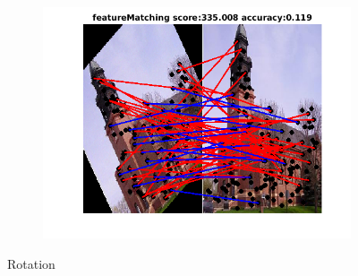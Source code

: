 \documentclass[
	fontsize=12pt,
	paper=a4,
	twoside=false,
	numbers=noenddot,
	plainheadsepline,
	toc=listof,
	toc=bibliography
]{scrartcl}
\begin{document}
\begin{figure}[h]
\begin{subfigure}[b]{0.3\textwidth}
	\end{subfigure} 
	\begin{subfigure}[b]{0.3\textwidth}
		\centering
		\includegraphics[scale=0.4]{"fig_ver2608/RealImages/Img_trafo/no_descr/using_cdf_afftrafo/fi_1_featM"} 
	\end{subfigure} 	
	\caption{Rotation}


\end{figure}
\end{document}
